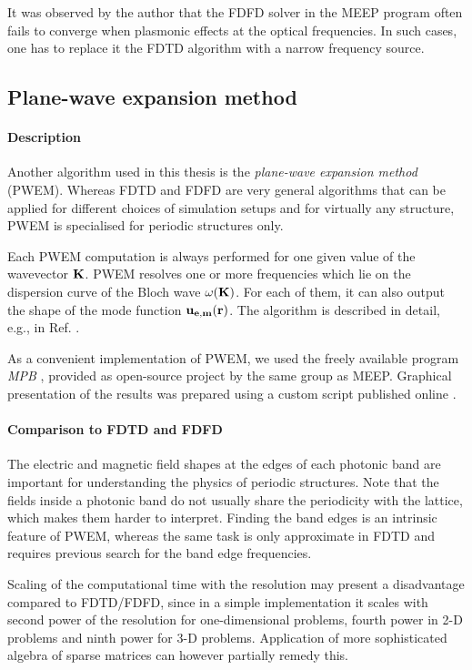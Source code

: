 It was observed by the author that the FDFD solver in the MEEP program often fails to converge when plasmonic effects at the optical frequencies. In such cases, one has to replace it the FDTD algorithm with a narrow frequency source.


\subsection{Plane-wave expansion method} %
\paragraph{Description} %
Another algorithm used in this thesis is the \textit{plane-wave expansion method} (PWEM). Whereas FDTD and FDFD are very general algorithms that can be applied for different choices of simulation setups and for virtually any structure, PWEM is specialised for periodic structures only. 

Each PWEM computation is always performed for one given value of the wavevector ${\mathbf{K}}$. PWEM resolves one or more frequencies which lie on the dispersion curve of the Bloch wave $\omega({\mathbf{K}})$. For each of them, it can also output the shape of the mode function $\mathbf{u_{e,m}}({\mathbf{r}})$. The algorithm is described in detail, e.g., in Ref. \cite[pp. 24-28]{pazoutova2011dp}.

As a convenient implementation of PWEM, we used the freely available program \textit{MPB} \cite{johnson2001mpb}, provided as open-source project by the same group \cite{ab-initio} as MEEP. Graphical presentation of the results was prepared using a custom script published online \cite{dominec2015_mpb}.

\paragraph{Comparison to FDTD and FDFD} %
The electric and magnetic field shapes at the edges of each photonic band are important for understanding the physics of periodic structures. Note that the fields inside a photonic band do not usually share the periodicity with the lattice, which makes them harder to interpret. Finding the band edges is an intrinsic feature of PWEM, whereas the same task is only approximate in FDTD and requires previous search for the band edge frequencies. 

Scaling of the computational time with the resolution may present a disadvantage compared to FDTD/FDFD, since in a simple implementation it scales with second power of the resolution for one-dimensional problems, fourth power in 2-D problems and ninth power for 3-D problems. Application of more sophisticated algebra of sparse matrices can however partially remedy this.


